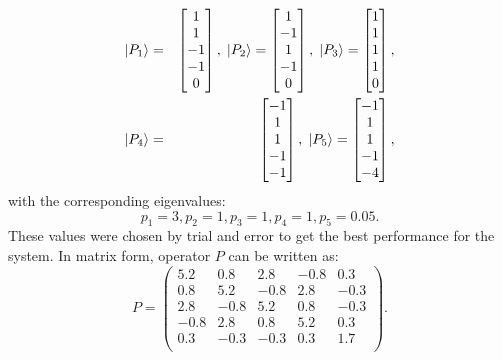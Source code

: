 \documentclass[journal]{IEEEtran}
\theoremstyle{definition}
\begin{document}
\begin{eqnarray}
     \ket{P_1}&=& \begin{bmatrix}
     1\\
     1\\
     -1\\
     -1\\
     0
\end{bmatrix}, \;
\ket{P_2}= \begin{bmatrix}
     1\\
     -1\\
     1\\
     -1\\
     0
\end{bmatrix}, \;
\ket{P_3}= \begin{bmatrix}
     1\\
     1\\
     1\\
     1\\
     0
\end{bmatrix}, \\
\ket{P_4}&=& \begin{bmatrix}
     -1\\
     1\\
     1\\
     -1\\
     -1
\end{bmatrix}, \;
\ket{P_5}= \begin{bmatrix}
     -1\\
     1\\
     1\\
     -1\\
    -4
\end{bmatrix}, \nonumber
\end{eqnarray}
with the corresponding eigenvalues:
  \begin{equation}
      p_1=3, p_2=1, p_3=1, p_4=1, p_5=0.05.
  \end{equation}
These values were chosen by trial and error to get the best performance for the system. In matrix form, operator $P$ can be written as:
   \begin{equation}
      P=\begin{pmatrix}
      5.2 & 0.8 & 2.8 & -0.8 & 0.3 \\
      0.8 & 5.2 & -0.8 & 2.8 & -0.3 \\ 
       2.8 & -0.8 & 5.2 & 0.8 & -0.3 \\
       -0.8 & 2.8 & 0.8 & 5.2 & 0.3 \\
       0.3 & -0.3 & -0.3 & 0.3 & 1.7 \\
      
      \end{pmatrix}.
  \end{equation}
\end{document}
